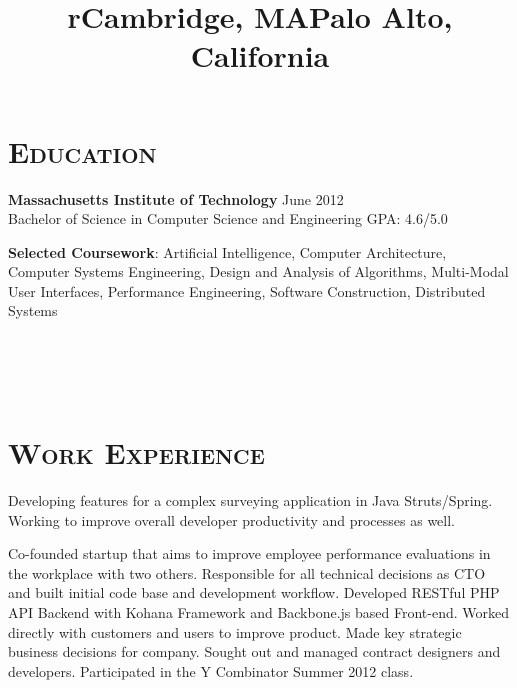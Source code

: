 \begin{resume}


\section{\textsc{Education}}

\textbf{Massachusetts Institute of Technology} \hfill{June 2012}\\
Bachelor of Science in Computer Science and Engineering \hfill{GPA: 4.6/5.0} 

\textbf{Selected Coursework}: Artificial Intelligence, Computer Architecture, Computer Systems Engineering, Design and Analysis of Algorithms, Multi-Modal User Interfaces, Performance Engineering, Software Construction, Distributed Systems



\begin{formatb}
  \title{r}\\
  \\
  \body\\
\end{formatb}

\section{\textsc{Work Experience}}

\title{Cambridge, MA}
\begin{position}
Developing features for a complex surveying application in Java Struts/Spring. Working to improve overall developer productivity and processes as well.
\end{position}

\title{Palo Alto, California}
\begin{position}
Co-founded startup that aims to improve employee performance evaluations in the workplace with two others. Responsible for all technical decisions as CTO and built initial code base and development workflow. Developed RESTful PHP API Backend with Kohana Framework and Backbone.js based Front-end. Worked directly with customers and users to improve product. Made key strategic business decisions for company. Sought out and managed contract designers and developers. Participated in the Y Combinator Summer 2012 class. 
\end{position}


\end{resume}
